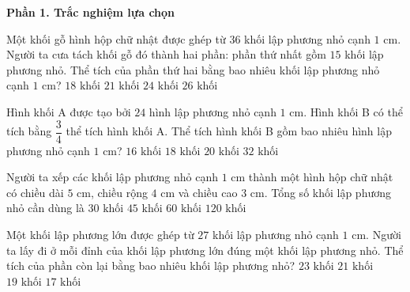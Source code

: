\textbf{Phần 1. Trắc nghiệm lựa chọn}

\begin{ex} %
Một khối gỗ hình hộp chữ nhật được ghép từ $36$ khối lập phương nhỏ cạnh $1\text{ cm}$. Người ta cưa tách khối gỗ đó thành hai phần: phần thứ nhất gồm $15$ khối lập phương nhỏ. Thể tích của phần thứ hai bằng bao nhiêu khối lập phương nhỏ cạnh $1\text{ cm}$?
\choice
{$18\text{ khối}$}
{\True $21\text{ khối}$}
{$24\text{ khối}$}
{$26\text{ khối}$}
\end{ex}

\begin{ex} %
Hình khối A được tạo bởi $24$ hình lập phương nhỏ cạnh $1\text{ cm}$. Hình khối B có thể tích bằng $\dfrac{3}{4}$ thể tích hình khối A. Thể tích hình khối B gồm bao nhiêu hình lập phương nhỏ cạnh $1\text{ cm}$?
\choice
{$16\text{ khối}$}
{\True $18\text{ khối}$}
{$20\text{ khối}$}
{$32\text{ khối}$}
\end{ex}

\begin{ex} %
Người ta xếp các khối lập phương nhỏ cạnh $1\text{ cm}$ thành một hình hộp chữ nhật có chiều dài $5\text{ cm}$, chiều rộng $4\text{ cm}$ và chiều cao $3\text{ cm}$. Tổng số khối lập phương nhỏ cần dùng là
\choice
{$30\text{ khối}$}
{$45\text{ khối}$}
{\True $60\text{ khối}$}
{$120\text{ khối}$}
\end{ex}

\begin{ex} %
Một khối lập phương lớn được ghép từ $27$ khối lập phương nhỏ cạnh $1\text{ cm}$. Người ta lấy đi ở mỗi đỉnh của khối lập phương lớn đúng một khối lập phương nhỏ. Thể tích của phần còn lại bằng bao nhiêu khối lập phương nhỏ?
\choice
{$23\text{ khối}$}
{$21\text{ khối}$}
{\True $19\text{ khối}$}
{$17\text{ khối}$}
\end{ex}

